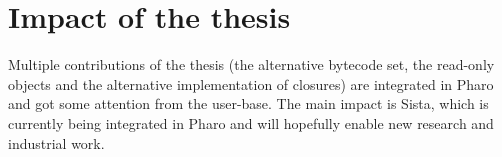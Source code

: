 \documentclass[a4paper,12pt,twoside]{../includes/ThesisStyle}
\begin{document}
\section{Impact of the thesis}

Multiple contributions of the thesis (the alternative bytecode set, the read-only objects and the alternative implementation of closures) are integrated in Pharo and got some attention from the user-base. The main impact is Sista, which is currently being integrated in Pharo and will hopefully enable new research and industrial work.

\ifx\wholebook\relax\else
    
\end{document}
